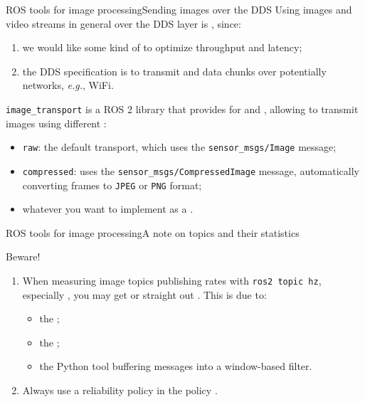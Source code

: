 \begin{frame}{ROS tools for image processing}{Sending images over the DDS}
	Using images and video streams in general over the DDS layer is , since:
	\begin{enumerate}
		\item we would like some kind of  to optimize throughput and latency;
		\item the DDS specification is  to transmit  and  data chunks over potentially  networks, \emph{e.g.}, WiFi.
	\end{enumerate}
	\texttt{image\_transport} is a ROS 2 library that provides  for  and , allowing to transmit images using different :
	\begin{itemize}
		\item \texttt{raw}: the default transport, which uses the \texttt{sensor\_msgs/Image} message;
		\item \texttt{compressed}: uses the \texttt{sensor\_msgs/CompressedImage} message, automatically converting frames to \texttt{JPEG} or \texttt{PNG} format;
		\item whatever you want to implement as a .
	\end{itemize}
\end{frame}
\begin{frame}{ROS tools for image processing}{A note on topics and their statistics}
	\begin{alertblock}{Beware!}
		\begin{enumerate}
			\item When measuring image topics publishing rates with \texttt{ros2 topic hz}, especially , you may get  or straight out . This is due to:
			      \begin{itemize}
				      \item the ;
				      \item the ;
				      \item the  Python tool buffering messages into a window-based filter.
			      \end{itemize}
      \item Always use a  reliability policy in the  policy .
		\end{enumerate}
	\end{alertblock}
\end{frame}
